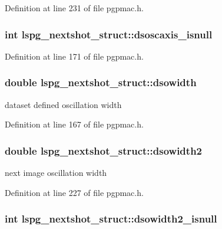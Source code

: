 Definition at line 231 of file pgpmac.h.\hypertarget{structlspg__nextshot__struct_a51a26391afcacfb4c946fb9e8e9ab6b0}{
\subsubsection[{dsoscaxis\_\-isnull}]{\setlength{\rightskip}{0pt plus 5cm}int {\bf lspg\_\-nextshot\_\-struct::dsoscaxis\_\-isnull}}}
\label{structlspg__nextshot__struct_a51a26391afcacfb4c946fb9e8e9ab6b0}


Definition at line 171 of file pgpmac.h.\hypertarget{structlspg__nextshot__struct_ad5a8f568a04aa6a13767933062b28f19}{
\subsubsection[{dsowidth}]{\setlength{\rightskip}{0pt plus 5cm}double {\bf lspg\_\-nextshot\_\-struct::dsowidth}}}
\label{structlspg__nextshot__struct_ad5a8f568a04aa6a13767933062b28f19}


dataset defined oscillation width 

Definition at line 167 of file pgpmac.h.\hypertarget{structlspg__nextshot__struct_a5378e13735a5392a9fcd853ce8c9e929}{
\subsubsection[{dsowidth2}]{\setlength{\rightskip}{0pt plus 5cm}double {\bf lspg\_\-nextshot\_\-struct::dsowidth2}}}
\label{structlspg__nextshot__struct_a5378e13735a5392a9fcd853ce8c9e929}


next image oscillation width 

Definition at line 227 of file pgpmac.h.\hypertarget{structlspg__nextshot__struct_a5ffd27b8063506fd54162658e5c2ce8a}{
\subsubsection[{dsowidth2\_\-isnull}]{\setlength{\rightskip}{0pt plus 5cm}int {\bf lspg\_\-nextshot\_\-struct::dsowidth2\_\-isnull}}}
\label{structlspg__nextshot__struct_a5ffd27b8063506fd54162658e5c2ce8a}


